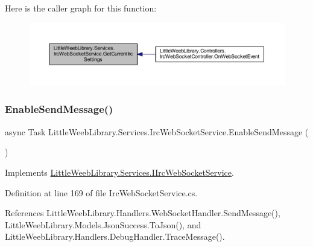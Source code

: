 Here is the caller graph for this function\+:\nopagebreak
\begin{figure}[H]
\begin{center}
\leavevmode
\includegraphics[width=350pt]{class_little_weeb_library_1_1_services_1_1_irc_web_socket_service_a9add76a72fff82d5b7009d34620516dd_icgraph}
\end{center}
\end{figure}
\mbox{\label{class_little_weeb_library_1_1_services_1_1_irc_web_socket_service_acd9aa44a2389caa8e997db49a646c448}} 
\subsubsection{\texorpdfstring{Enable\+Send\+Message()}{EnableSendMessage()}}
{\footnotesize\ttfamily async Task Little\+Weeb\+Library.\+Services.\+Irc\+Web\+Socket\+Service.\+Enable\+Send\+Message (\begin{DoxyParamCaption}{ }\end{DoxyParamCaption})}



Implements \mbox{\hyperlink{interface_little_weeb_library_1_1_services_1_1_i_irc_web_socket_service_ad873d87b345c52b09672423c707862ac}{Little\+Weeb\+Library.\+Services.\+I\+Irc\+Web\+Socket\+Service}}.



Definition at line 169 of file Irc\+Web\+Socket\+Service.\+cs.



References Little\+Weeb\+Library.\+Handlers.\+Web\+Socket\+Handler.\+Send\+Message(), Little\+Weeb\+Library.\+Models.\+Json\+Success.\+To\+Json(), and Little\+Weeb\+Library.\+Handlers.\+Debug\+Handler.\+Trace\+Message().




